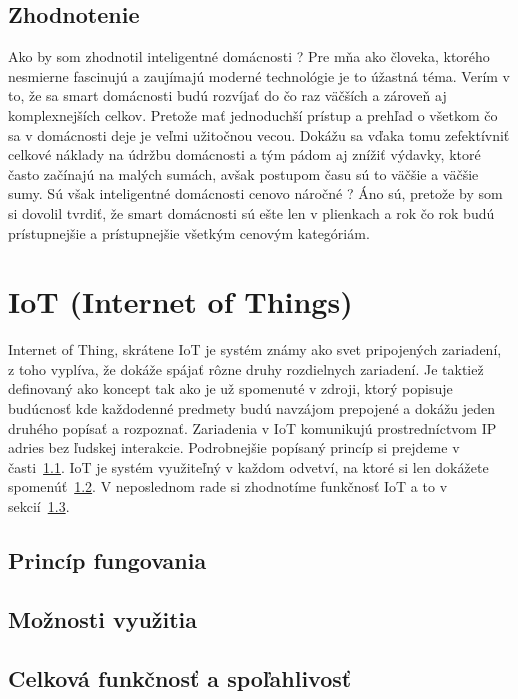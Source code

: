 \documentclass[10pt,twoside,slovak,a4paper]{article}
\begin{document}
\subsection{Zhodnotenie}\label{domacnosti:zhodnotenie}

Ako by som zhodnotil inteligentné domácnosti ? Pre mňa ako človeka, ktorého nesmierne fascinujú a zaujímajú moderné technológie je to úžastná téma. Verím v to, že sa smart domácnosti budú rozvíjať do čo raz väčších a zároveň aj komplexnejších celkov. Pretože mať jednoduchší prístup a prehľad o všetkom čo sa v domácnosti deje je veľmi užitočnou vecou. Dokážu sa vďaka tomu zefektívniť celkové náklady na údržbu domácnosti a tým pádom aj znížiť výdavky, ktoré často začínajú na malých sumách, avšak postupom času sú to väčšie a väčšie sumy. Sú však inteligentné domácnosti cenovo náročné ? Áno sú, pretože by som si dovolil tvrdiť, že smart domácnosti sú ešte len v plienkach a rok čo rok budú prístupnejšie a prístupnejšie všetkým cenovým kategóriám.


\section{IoT (Internet of Things)}\label{IoT}

Internet of Thing, skrátene IoT je systém známy ako svet pripojených zariadení, z toho vyplíva, že dokáže spájať rôzne druhy rozdielnych zariadení. Je taktiež definovaný ako koncept tak ako je už spomenuté v zdroji\cite{IoTbasedSmartHome}, ktorý popisuje budúcnosť kde každodenné predmety budú navzájom prepojené a dokážu jeden druhého popísať a rozpoznať. Zariadenia v IoT komunikujú prostredníctvom IP adries bez ľudskej interakcie. Podrobnejšie popísaný princíp si prejdeme v časti~\ref{IoT:princíp}. IoT je systém využiteľný v každom odvetví, na ktoré si len dokážete spomenúť~\ref{IoT:využitie}. V neposlednom rade si zhodnotíme funkčnosť IoT a to v sekcií~\ref{IoTi:funkčnosť}.


\subsection{Princíp fungovania}\label{IoT:princíp}

\subsection{Možnosti využitia}\label{IoT:využitie}

\subsection{Celková funkčnosť a spoľahlivosť}\label{IoTi:funkčnosť}
\end{document}
